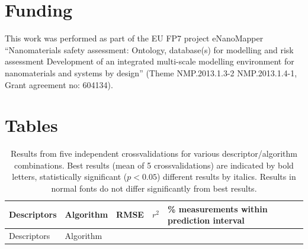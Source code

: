 \documentclass[utf8]{frontiersHLTH} %
\begin{document}
\section{Funding}\label{funding}

This work was performed as part of the EU FP7 project eNanoMapper
``Nanomaterials safety assessment: Ontology, database(s) for modelling
and risk assessment Development of an integrated multi-scale modelling
environment for nanomaterials and systems by design'' (Theme
NMP.2013.1.3-2 NMP.2013.1.4-1, Grant agreement no: 604134).

\section{Tables}\label{tables}

\begin{longtable}[]{@{}lllll@{}}
\caption{Results from five independent crossvalidations for various
descriptor/algorithm combinations. Best results (mean of 5
crossvalidations) are indicated by bold letters, statistically
significant (\(p<0.05\)) different results by italics. Results in normal
fonts do not differ significantly from best results. }\tabularnewline
\toprule
\begin{minipage}[b]{0.13\columnwidth}\raggedright\strut
Descriptors\strut
\end{minipage} & \begin{minipage}[b]{0.08\columnwidth}\raggedright\strut
Algorithm\strut
\end{minipage} & \begin{minipage}[b]{0.19\columnwidth}\raggedright\strut
RMSE\strut
\end{minipage} & \begin{minipage}[b]{0.19\columnwidth}\raggedright\strut
\(r^2\)\strut
\end{minipage} & \begin{minipage}[b]{0.27\columnwidth}\raggedright\strut
\% measurements within prediction interval\strut
\end{minipage}\tabularnewline
\midrule
\endfirsthead
\toprule
\begin{minipage}[b]{0.13\columnwidth}\raggedright\strut
Descriptors\strut
\end{minipage} & \begin{minipage}[b]{0.08\columnwidth}\raggedright\strut
Algorithm\strut
\end{minipage} & \begin{minipage}[b]{0.19\columnwidth}\raggedright\strut

\end{minipage}
\end{longtable}
\end{document}
